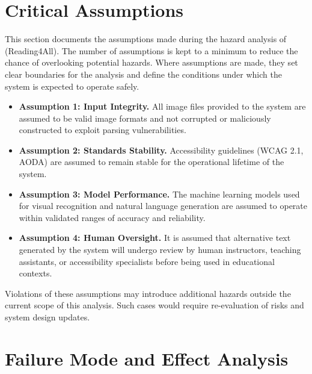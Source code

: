 \documentclass{article}
\begin{document}
\section{Critical Assumptions}
This section documents the assumptions made during the hazard analysis of
\progname{} (Reading4All). The number of assumptions is kept to a minimum
to reduce the chance of overlooking potential hazards. Where assumptions
are made, they set clear boundaries for the analysis and define the
conditions under which the system is expected to operate safely.

\begin{itemize}
  \item \textbf{Assumption 1: Input Integrity.} All image files provided
    to the system are assumed to be valid image formats and not corrupted
    or maliciously constructed to exploit parsing vulnerabilities.

  \item \textbf{Assumption 2: Standards Stability.} Accessibility
    guidelines (WCAG 2.1, AODA) are assumed to remain stable for the
    operational lifetime of the system.

  \item \textbf{Assumption 3: Model Performance.} The machine learning
    models used for visual recognition and natural language generation are
    assumed to operate within validated ranges of accuracy and reliability.

  \item \textbf{Assumption 4: Human Oversight.} It is assumed that
    alternative text generated by the system will undergo review by human
    instructors, teaching assistants, or accessibility specialists before
    being used in educational contexts.
\end{itemize}

Violations of these assumptions may introduce additional hazards outside
the current scope of this analysis. Such cases would require
re-evaluation of risks and system design updates.

\section{Failure Mode and Effect Analysis}

\end{document}
